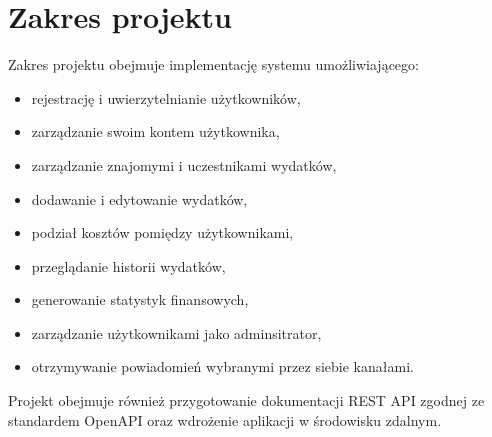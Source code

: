 \section{Zakres projektu}

Zakres projektu obejmuje implementację systemu umożliwiającego:
\begin{itemize}
	\item rejestrację i uwierzytelnianie użytkowników,
	\item zarządzanie swoim kontem użytkownika,
	\item zarządzanie znajomymi i uczestnikami wydatków,
	\item dodawanie i edytowanie wydatków,
	\item podział kosztów pomiędzy użytkownikami,
	\item przeglądanie historii wydatków,
	\item generowanie statystyk finansowych,
	\item zarządzanie użytkownikami jako adminsitrator,
	\item otrzymywanie powiadomień wybranymi przez siebie kanałami.
\end{itemize}

Projekt obejmuje również przygotowanie dokumentacji REST API zgodnej ze standardem OpenAPI oraz wdrożenie aplikacji w środowisku zdalnym.